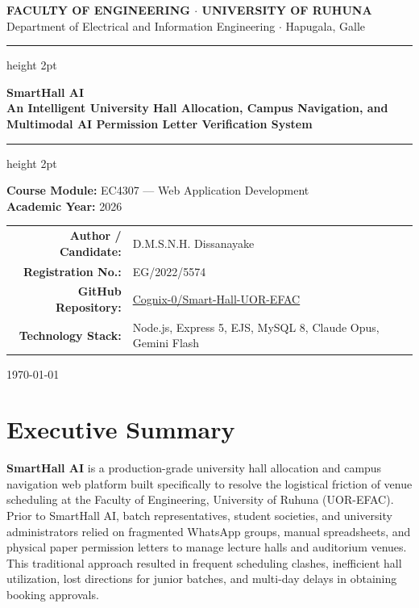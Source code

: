 \documentclass[11pt,a4paper]{article}
\begin{document}
\begin{titlepage}
    \centering
    \vspace*{1cm}
    {\Large \textbf{FACULTY OF ENGINEERING $\cdot$ UNIVERSITY OF RUHUNA}}\\[0.3cm]
    {\large Department of Electrical and Information Engineering $\cdot$ Hapugala, Galle}\\[1.5cm]

    {\color{uormaroon}\hrule height 2pt}\vspace{0.8cm}
    {\Huge \textbf{SmartHall AI}}\\[0.4cm]
    {\Large \textbf{An Intelligent University Hall Allocation, Campus Navigation, and Multimodal AI Permission Letter Verification System}}\\[0.8cm]
    {\color{uormaroon}\hrule height 2pt}\vspace{1.5cm}

    \textbf{Course Module:} EC4307 — Web Application Development\\[0.3cm]
    \textbf{Academic Year:} 2026\\[1.5cm]

    \begin{tabular}{rl}
        \textbf{Author / Candidate:} & D.M.S.N.H. Dissanayake \\
        \textbf{Registration No.:} & EG/2022/5574 \\
        \textbf{GitHub Repository:} & \href{https://github.com/Cognix-0/Smart-Hall-UOR-EFAC}{Cognix-0/Smart-Hall-UOR-EFAC} \\
        \textbf{Technology Stack:} & Node.js, Express 5, EJS, MySQL 8, Claude Opus, Gemini Flash
    \end{tabular}

    \vfill
    {\large \today}
\end{titlepage}

\section*{Executive Summary}

\textbf{SmartHall AI} is a production-grade university hall allocation and campus navigation web platform built specifically to resolve the logistical friction of venue scheduling at the Faculty of Engineering, University of Ruhuna (UOR-EFAC). Prior to SmartHall AI, batch representatives, student societies, and university administrators relied on fragmented WhatsApp groups, manual spreadsheets, and physical paper permission letters to manage lecture halls and auditorium venues. This traditional approach resulted in frequent scheduling clashes, inefficient hall utilization, lost directions for junior batches, and multi-day delays in obtaining booking approvals.
\end{document}
